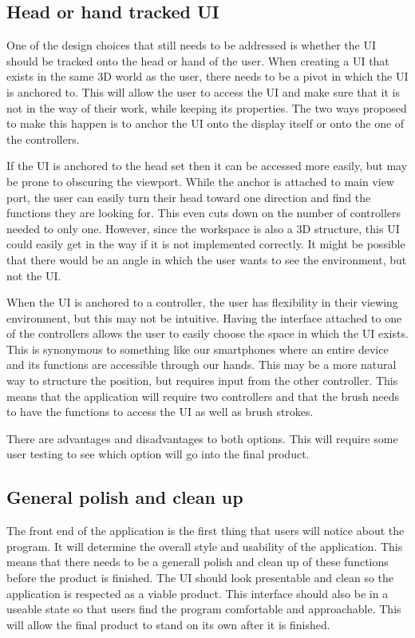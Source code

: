 \documentclass[onecolumn, draftclsnofoot,10pt, compsoc]{IEEEtran}
\begin{document}
\subsection{Head or hand tracked UI}
One of the design choices that still needs to be addressed is whether the UI should be tracked onto the head or hand of the user. When creating a UI that exists in the same 3D world as the user, there needs to be a pivot in which the UI is anchored to. This will allow the user to access the UI and make sure that it is not in the way of their work, while keeping its properties. The two ways proposed to make this happen is to anchor the UI onto the display itself or onto the one of the controllers.

If the UI is anchored to the head set then it can be accessed more easily, but may be prone to obscuring the viewport. While the anchor is attached to main view port, the user can easily turn their head toward one direction and find the functions they are looking for. This even cuts down on the number of controllers needed to only one. However, since the workspace is also a 3D structure, this UI could easily get in the way if it is not implemented correctly. It might be possible that there would be an angle in which the user wants to see the environment, but not the UI. 

When the UI is anchored to a controller, the user has flexibility in their viewing environment, but this may not be intuitive. Having the interface attached to one of the controllers allows the user to easily choose the space in which the UI exists. This is synonymous to something like our smartphones where an entire device and its functions are accessible through our hands. This may be a more natural way to structure the position, but requires input from the other controller. This means that the application will require two controllers and that the brush needs to have the functions to access the UI as well as brush strokes. 

There are advantages and disadvantages to both options. This will require some user testing to see which option will go into the final product. 

\subsection{General polish and clean up}
The front end of the application is the first thing that users will notice about the program. It will determine the overall style and usability of the application. This means that there needs to be a generall polish and clean up of these functions before the product is finished. The UI should look presentable and clean so the application is respected as a viable product. This interface should also be in a useable state so that users find the program comfortable and approachable. This will allow the final product to stand on its own after it is finished. 
\end{document}
